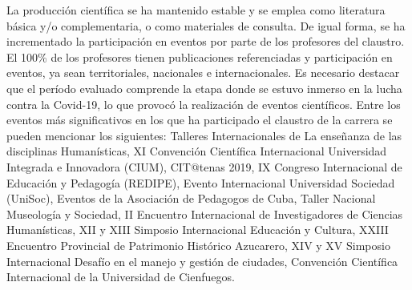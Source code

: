 La producción científica se ha mantenido estable y se emplea como literatura básica y/o complementaria, o como materiales de consulta. De igual forma, se ha incrementado la participación en eventos por parte de los profesores del claustro. El 100\% de los profesores tienen publicaciones referenciadas y participación en eventos, ya sean territoriales, nacionales e internacionales. Es necesario destacar que el período evaluado comprende la etapa donde se estuvo inmerso en la lucha contra la Covid-19, lo que provocó la realización de eventos científicos. Entre los eventos más significativos en los que ha participado el claustro de la carrera se pueden mencionar los siguientes: Talleres Internacionales de La enseñanza de las disciplinas Humanísticas, XI Convención Científica Internacional Universidad Integrada e Innovadora (CIUM), CIT@tenas 2019, IX Congreso Internacional de Educación y Pedagogía (REDIPE), Evento Internacional Universidad Sociedad (UniSoc), Eventos de la Asociación de Pedagogos de Cuba, Taller Nacional Museología y Sociedad, II Encuentro Internacional de Investigadores de Ciencias Humanísticas, XII y XIII Simposio Internacional Educación y Cultura, XXIII Encuentro Provincial de Patrimonio Histórico Azucarero, XIV y XV Simposio Internacional Desafío en el manejo y gestión de ciudades, Convención Científica Internacional de la Universidad de Cienfuegos.